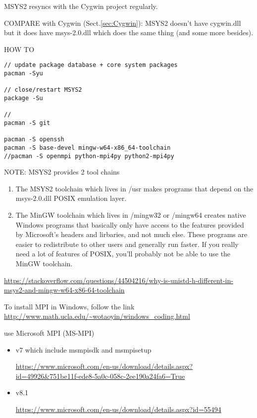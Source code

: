 MSYS2 resyncs with the Cygwin project regularly. 

COMPARE with Cygwin (Sect.\ref{sec:Cygwin}): MSYS2 doesn't have cygwin.dll but
it does have msys-2.0.dll which does the same thing (and some more besides).

HOW TO
\begin{verbatim}
// update package database + core system packages
pacman -Syu

// close/restart MSYS2
package -Su

// 
pacman -S git

pacman -S openssh
pacman -S base-devel mingw-w64-x86_64-toolchain
//pacman -S openmpi python-mpi4py python2-mpi4py
\end{verbatim}

NOTE: MSYS2 provides 2 tool chains
\begin{enumerate}

  \item The MSYS2 toolchain which lives in /usr makes programs that depend on
  the msys-2.0.dll POSIX emulation layer.
  
  \item The MinGW toolchain which lives in /mingw32 or /mingw64 creates native
  Windows programs that basically only have access to the features provided by
  Microsoft's headers and lirbaries, and not much else. These programs are
  easier to redistribute to other users and generally run faster. If you really
  need a lot of features of POSIX, you'll probably not be able to use the MinGW
  toolchain.
\end{enumerate}
\url{https://stackoverflow.com/questions/44504216/why-is-unistd-h-different-in-msys2-and-mingw-w64-x86-64-toolchain}


To install MPI in Windows, follow the link
\url{http://www.math.ucla.edu/~wotaoyin/windows_coding.html}

use Microsoft MPI (MS-MPI) 
\begin{itemize}
  \item 
v7  which include msmpisdk  and msmpisetup

\url{https://www.microsoft.com/en-us/download/details.aspx?id=49926&751be11f-ede8-5a0c-058c-2ee190a24fa6=True}

  \item v8.1
  
\url{https://www.microsoft.com/en-us/download/details.aspx?id=55494} 
\end{itemize}

